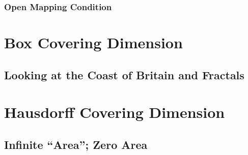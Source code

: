 \documentclass{article}
\begin{document}
\subsubsection{Open Mapping Condition} %
\newpage
\section{Box Covering Dimension}
\subsection{Looking at the Coast of Britain and Fractals}
\section{Hausdorff Covering Dimension}
\subsection{Infinite ``Area''; Zero Area}
%								
%
\end{document}
